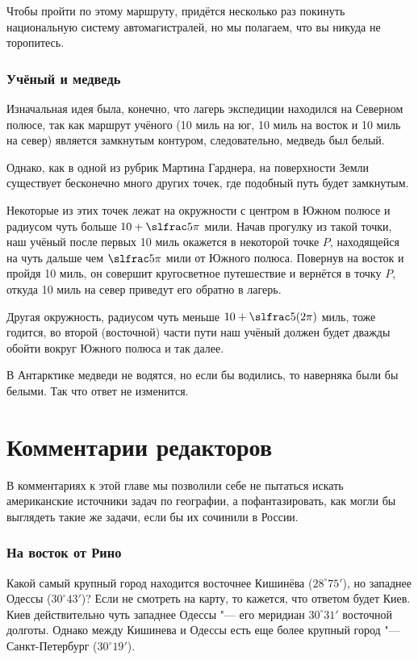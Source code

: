\documentclass[twoside]{book}
\begin{document}
Чтобы пройти по этому маршруту, придётся несколько раз 
покинуть национальную систему автомагистралей, но мы полагаем, что вы никуда не торопитесь.

\subsubsection*{Учёный и медведь}%

Изначальная идея была, конечно, что лагерь экспедиции находился на Северном полюсе, так как маршрут учёного (10 миль на юг, 10 миль на восток и 10 миль на север) является замкнутым контуром, %
следовательно, медведь был белый.

Однако, как  в одной из рубрик %
Мартина Гарднера, %
на поверхности Земли существует бесконечно много других точек, где подобный путь будет замкнутым.

Некоторые из этих точек лежат на окружности с центром в Южном полюсе и радиусом чуть больше $10 + \slfrac5\pi$ мили.
Начав прогулку из такой точки, наш учёный после первых 10 миль окажется в некоторой точке $P$, 
находящейся на чуть дальше чем $\slfrac5\pi$ мили от Южного полюса.
Повернув на восток и пройдя 10 миль, он совершит кругосветное путешествие и вернётся в точку $P$, откуда 10 миль на север приведут его обратно в лагерь.

Другая окружность, радиусом чуть меньше $10 + \slfrac5{(2\pi)}$ миль, тоже годится, во второй (восточной) части пути наш учёный должен будет дважды обойти вокруг Южного полюса и так далее.

В Антарктике медведи не водятся, но если бы водились, то наверняка были бы белыми.
Так что ответ не изменится.\heart

\section*{Комментарии редакторов}

В комментариях к этой главе мы позволили себе не пытаться искать американские источники задач по географии, 
а пофантазировать, как могли бы выглядеть такие же задачи, если бы их сочинили в России.

\subsubsection*{На восток от Рино}
Какой самый крупный город находится восточнее Кишинёва ($28^\circ75'$), но западнее Одессы ($30^\circ43'$)? 
Если не смотреть на карту, то кажется, что ответом будет Киев. Киев действительно чуть западнее Одессы "--- его
меридиан $30^\circ31'$ восточной долготы. Однако между Кишинева и Одессы есть еще более крупный город "--- Санкт-Петербург
($30^\circ19'$).
\end{document}

